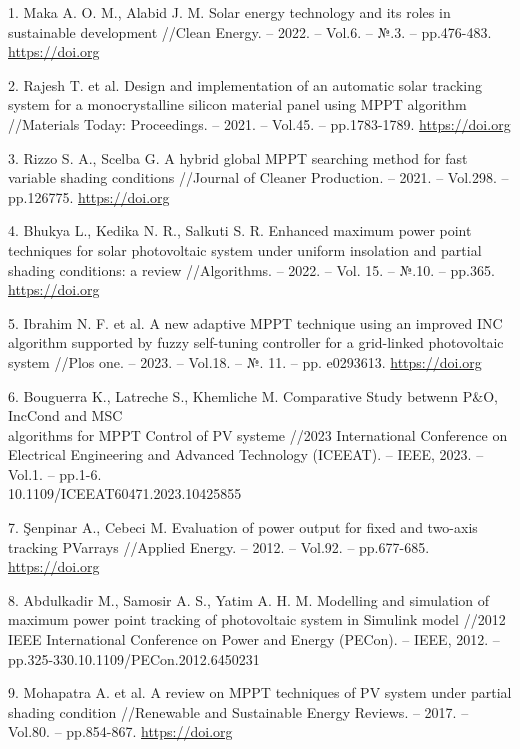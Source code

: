 \begin{references}
1. Maka A. O. M., Alabid J. M. Solar energy technology and its roles in
sustainable development //Clean Energy. -- 2022. -- Vol.6. -- №.3.
-- pp.476-483.
\href{https://doi.org/10.1093/ce/zkac023}{https://doi.org}

2. Rajesh T. et al. Design and implementation of an automatic solar
tracking system for a monocrystalline silicon material panel using
MPPT algorithm //Materials Today: Proceedings. -- 2021. -- Vol.45. --
pp.1783-1789.
\href{https://doi.org/10.1016/j.matpr.2020.08.635}{https://doi.org}

3. Rizzo S. A., Scelba G. A hybrid global MPPT searching method for fast
variable shading conditions //Journal of Cleaner Production. -- 2021.
-- Vol.298. -- pp.126775.
\href{https://doi.org/10.1016/j.jclepro.2021.126775}{https://doi.org}

4. Bhukya L., Kedika N. R., Salkuti S. R. Enhanced maximum power point
techniques for solar photovoltaic system under uniform insolation and
partial shading conditions: a review //Algorithms. -- 2022. -- Vol.
15. -- №.10. -- pp.365.
\href{https://doi.org/10.3390/a15100365}{https://doi.org}

5. Ibrahim N. F. et al. A new adaptive MPPT technique using an improved
INC algorithm supported by fuzzy self-tuning controller for a
grid-linked photovoltaic system //Plos one. -- 2023. -- Vol.18. -- №.
11. -- pp. e0293613.
\href{https://doi.org/10.1371/journal.pone.0293613}{https://doi.org}

6. Bouguerra K., Latreche S., Khemliche M. Comparative Study betwenn
P\&O, IncCond and MSC \\algorithms for MPPT Control of PV systeme
//2023 International Conference on Electrical Engineering and Advanced
Technology (ICEEAT). -- IEEE, 2023. -- Vol.1. -- pp.1-6.\\
10.1109/ICEEAT60471.2023.10425855

7. Şenpinar A., Cebeci M. Evaluation of power output for fixed and
two-axis tracking PVarrays //Applied Energy. -- 2012. -- Vol.92. --
pp.677-685.
\href{https://doi.org/10.1016/j.apenergy.2011.07.043}{https://doi.org}

8. Abdulkadir M., Samosir A. S., Yatim A. H. M. Modelling and simulation
of maximum power point tracking of photovoltaic system in Simulink
model //2012 IEEE International Conference on Power and Energy
(PECon). -- IEEE, 2012. -- pp.325-330.10.1109/PECon.2012.6450231

9. Mohapatra A. et al. A review on MPPT techniques of PV system under
partial shading condition //Renewable and Sustainable Energy Reviews.
-- 2017. -- Vol.80. -- pp.854-867.
\href{https://doi.org/10.1016/j.rser.2017.05.083}{https://doi.org}


\end{references}
